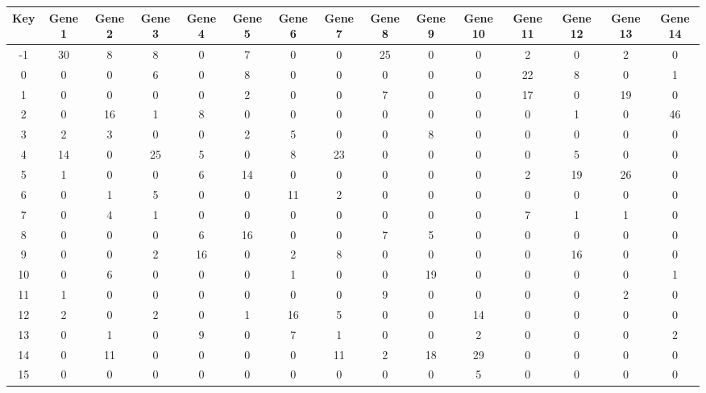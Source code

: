 \begin{tabular}{|c|c|c|c|c|c|c|c|c|c|c|c|c|c|c|}
\hline
Key & Gene 1 & Gene 2 & Gene 3 & Gene 4 & Gene 5 & Gene 6 & Gene 7 & Gene 8 & Gene 9 & Gene 10 & Gene 11 & Gene 12 & Gene 13 & Gene 14 \\
\hline
-1 & 30 & 8 & 8 & 0 & 7 & 0 & 0 & 25 & 0 & 0 & 2 & 0 & 2 & 0 \\
0 & 0 & 0 & 6 & 0 & 8 & 0 & 0 & 0 & 0 & 0 & 22 & 8 & 0 & 1 \\
1 & 0 & 0 & 0 & 0 & 2 & 0 & 0 & 7 & 0 & 0 & 17 & 0 & 19 & 0 \\
2 & 0 & 16 & 1 & 8 & 0 & 0 & 0 & 0 & 0 & 0 & 0 & 1 & 0 & 46 \\
3 & 2 & 3 & 0 & 0 & 2 & 5 & 0 & 0 & 8 & 0 & 0 & 0 & 0 & 0 \\
4 & 14 & 0 & 25 & 5 & 0 & 8 & 23 & 0 & 0 & 0 & 0 & 5 & 0 & 0 \\
5 & 1 & 0 & 0 & 6 & 14 & 0 & 0 & 0 & 0 & 0 & 2 & 19 & 26 & 0 \\
6 & 0 & 1 & 5 & 0 & 0 & 11 & 2 & 0 & 0 & 0 & 0 & 0 & 0 & 0 \\
7 & 0 & 4 & 1 & 0 & 0 & 0 & 0 & 0 & 0 & 0 & 7 & 1 & 1 & 0 \\
8 & 0 & 0 & 0 & 6 & 16 & 0 & 0 & 7 & 5 & 0 & 0 & 0 & 0 & 0 \\
9 & 0 & 0 & 2 & 16 & 0 & 2 & 8 & 0 & 0 & 0 & 0 & 16 & 0 & 0 \\
10 & 0 & 6 & 0 & 0 & 0 & 1 & 0 & 0 & 19 & 0 & 0 & 0 & 0 & 1 \\
11 & 1 & 0 & 0 & 0 & 0 & 0 & 0 & 9 & 0 & 0 & 0 & 0 & 2 & 0 \\
12 & 2 & 0 & 2 & 0 & 1 & 16 & 5 & 0 & 0 & 14 & 0 & 0 & 0 & 0 \\
13 & 0 & 1 & 0 & 9 & 0 & 7 & 1 & 0 & 0 & 2 & 0 & 0 & 0 & 2 \\
14 & 0 & 11 & 0 & 0 & 0 & 0 & 11 & 2 & 18 & 29 & 0 & 0 & 0 & 0 \\
15 & 0 & 0 & 0 & 0 & 0 & 0 & 0 & 0 & 0 & 5 & 0 & 0 & 0 & 0 \\
\hline
\end{tabular}